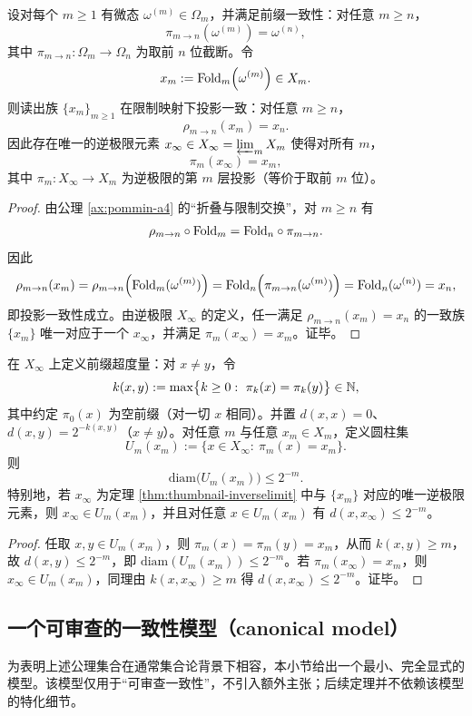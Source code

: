\begin{theorem}\label{thm:thumbnail-inverselimit}
设对每个 $m\ge 1$ 有微态 $\omega^{(m)}\in\Omega_m$，并满足前缀一致性：对任意 $m\ge n$，
$$
\pi_{m\to n}\!\left(\omega^{(m)}\right)=\omega^{(n)},
$$
其中 $\pi_{m\to n}:\Omega_m\to\Omega_n$ 为取前 $n$ 位截断。令
$$
x_m:=\mathrm{Fold}_m\!\left(\omega^{(m)}\right)\in X_m.
$$
则读出族 $\{x_m\}_{m\ge 1}$ 在限制映射下投影一致：对任意 $m\ge n$，
$$
\rho_{m\to n}(x_m)=x_n.
$$
因此存在唯一的逆极限元素 $x_\infty\in X_\infty=\varprojlim_m X_m$ 使得对所有 $m$，
$$
\pi_m(x_\infty)=x_m,
$$
其中 $\pi_m:X_\infty\to X_m$ 为逆极限的第 $m$ 层投影（等价于取前 $m$ 位）。
\end{theorem}

\begin{proof}
由公理 \ref{ax:pommin-a4} 的“折叠与限制交换”，对 $m\ge n$ 有
$$
\rho_{m\to n}\circ \mathrm{Fold}_m=\mathrm{Fold}_n\circ \pi_{m\to n}.
$$
因此
$$
\rho_{m\to n}(x_m)
=\rho_{m\to n}\!\left(\mathrm{Fold}_m(\omega^{(m)})\right)
=\mathrm{Fold}_n\!\left(\pi_{m\to n}(\omega^{(m)})\right)
=\mathrm{Fold}_n(\omega^{(n)})
=x_n,
$$
即投影一致性成立。由逆极限 $X_\infty$ 的定义，任一满足 $\rho_{m\to n}(x_m)=x_n$ 的一致族 $\{x_m\}$ 唯一对应于一个 $x_\infty$，并满足 $\pi_m(x_\infty)=x_m$。证毕。
\end{proof}

\begin{corollary}[前缀超度量下的圆柱直径律]\label{cor:ultrametric-cylinder-diameter}
在 $X_\infty$ 上定义前缀超度量：对 $x\neq y$，令
$$
k(x,y):=\max\bigl\{k\ge 0:\ \pi_k(x)=\pi_k(y)\bigr\}\in\NN,
$$
其中约定 $\pi_0(x)$ 为空前缀（对一切 $x$ 相同）。并置 $d(x,x)=0$、$d(x,y)=2^{-k(x,y)}$（$x\neq y$）。对任意 $m$ 与任意 $x_m\in X_m$，定义圆柱集
$$
U_m(x_m):=\{x\in X_\infty:\ \pi_m(x)=x_m\}.
$$
则
$$
\mathrm{diam}\bigl(U_m(x_m)\bigr)\le 2^{-m}.
$$
特别地，若 $x_\infty$ 为定理 \ref{thm:thumbnail-inverselimit} 中与 $\{x_m\}$ 对应的唯一逆极限元素，则 $x_\infty\in U_m(x_m)$，并且对任意 $x\in U_m(x_m)$ 有 $d(x,x_\infty)\le 2^{-m}$。
\end{corollary}

\begin{proof}
任取 $x,y\in U_m(x_m)$，则 $\pi_m(x)=\pi_m(y)=x_m$，从而 $k(x,y)\ge m$，故 $d(x,y)\le 2^{-m}$，即 $\mathrm{diam}(U_m(x_m))\le 2^{-m}$。若 $\pi_m(x_\infty)=x_m$，则 $x_\infty\in U_m(x_m)$，同理由 $k(x,x_\infty)\ge m$ 得 $d(x,x_\infty)\le 2^{-m}$。证毕。
\end{proof}

\subsection{一个可审查的一致性模型（canonical model）}\label{subsec:canonical-model}
为表明上述公理集合在通常集合论背景下相容，本小节给出一个最小、完全显式的模型。该模型仅用于“可审查一致性”，不引入额外主张；后续定理并不依赖该模型的特化细节。\par

